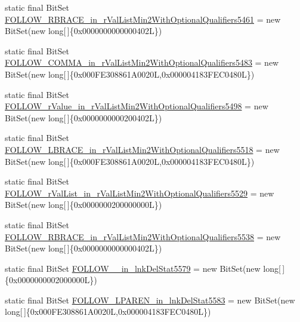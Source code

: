 \begin{DoxyCompactItemize}
static final Bit\-Set \hyperlink{classorg_1_1tzi_1_1use_1_1parser_1_1testsuite_1_1_test_suite_parser_a5d75cd4a58f6ac0cc8d78a84b00cca95}{F\-O\-L\-L\-O\-W\-\_\-\-R\-B\-R\-A\-C\-E\-\_\-in\-\_\-r\-Val\-List\-Min2\-With\-Optional\-Qualifiers5461} = new Bit\-Set(new long\mbox{[}$\,$\mbox{]}\{0x0000000000000402\-L\})
\item 
static final Bit\-Set \hyperlink{classorg_1_1tzi_1_1use_1_1parser_1_1testsuite_1_1_test_suite_parser_a263a782c518d3073b9eba4082709900c}{F\-O\-L\-L\-O\-W\-\_\-\-C\-O\-M\-M\-A\-\_\-in\-\_\-r\-Val\-List\-Min2\-With\-Optional\-Qualifiers5483} = new Bit\-Set(new long\mbox{[}$\,$\mbox{]}\{0x000\-F\-E308861\-A0020\-L,0x000004183\-F\-E\-C0480\-L\})
\item 
static final Bit\-Set \hyperlink{classorg_1_1tzi_1_1use_1_1parser_1_1testsuite_1_1_test_suite_parser_a5a5d6234336aa96d560fd15288a707d2}{F\-O\-L\-L\-O\-W\-\_\-r\-Value\-\_\-in\-\_\-r\-Val\-List\-Min2\-With\-Optional\-Qualifiers5498} = new Bit\-Set(new long\mbox{[}$\,$\mbox{]}\{0x0000000000200402\-L\})
\item 
static final Bit\-Set \hyperlink{classorg_1_1tzi_1_1use_1_1parser_1_1testsuite_1_1_test_suite_parser_ac4777491e458e933f987487c697af72f}{F\-O\-L\-L\-O\-W\-\_\-\-L\-B\-R\-A\-C\-E\-\_\-in\-\_\-r\-Val\-List\-Min2\-With\-Optional\-Qualifiers5518} = new Bit\-Set(new long\mbox{[}$\,$\mbox{]}\{0x000\-F\-E308861\-A0020\-L,0x000004183\-F\-E\-C0480\-L\})
\item 
static final Bit\-Set \hyperlink{classorg_1_1tzi_1_1use_1_1parser_1_1testsuite_1_1_test_suite_parser_a32b8735b57e15bf52207ffe034e0ffbb}{F\-O\-L\-L\-O\-W\-\_\-r\-Val\-List\-\_\-in\-\_\-r\-Val\-List\-Min2\-With\-Optional\-Qualifiers5529} = new Bit\-Set(new long\mbox{[}$\,$\mbox{]}\{0x0000000200000000\-L\})
\item 
static final Bit\-Set \hyperlink{classorg_1_1tzi_1_1use_1_1parser_1_1testsuite_1_1_test_suite_parser_a6e800603ac3a023437dfadab290f37cc}{F\-O\-L\-L\-O\-W\-\_\-\-R\-B\-R\-A\-C\-E\-\_\-in\-\_\-r\-Val\-List\-Min2\-With\-Optional\-Qualifiers5538} = new Bit\-Set(new long\mbox{[}$\,$\mbox{]}\{0x0000000000000402\-L\})
\item 
static final Bit\-Set \hyperlink{classorg_1_1tzi_1_1use_1_1parser_1_1testsuite_1_1_test_suite_parser_a244b2199f85af0422b3f295f654b121b}{F\-O\-L\-L\-O\-W\-\_\-\_\-in\-\_\-lnk\-Del\-Stat5579} = new Bit\-Set(new long\mbox{[}$\,$\mbox{]}\{0x0000000002000000\-L\})
\item 
static final Bit\-Set \hyperlink{classorg_1_1tzi_1_1use_1_1parser_1_1testsuite_1_1_test_suite_parser_a7e513e04e825425dd7e6ad8cfd8bd010}{F\-O\-L\-L\-O\-W\-\_\-\-L\-P\-A\-R\-E\-N\-\_\-in\-\_\-lnk\-Del\-Stat5583} = new Bit\-Set(new long\mbox{[}$\,$\mbox{]}\{0x000\-F\-E308861\-A0020\-L,0x000004183\-F\-E\-C0480\-L\})

\end{DoxyCompactItemize}
